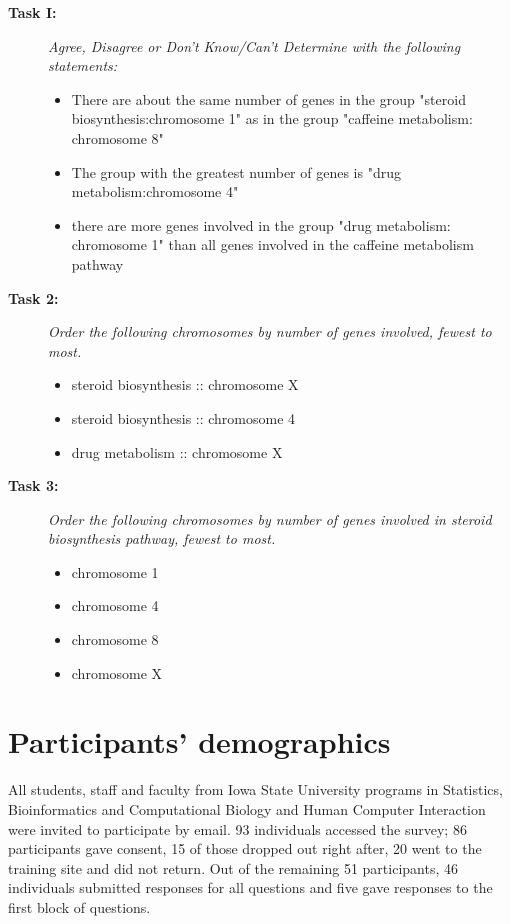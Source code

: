 \begin{description}
\item[\bf Task I:]\emph{ Agree, Disagree or Don't Know/Can't Determine with the following statements:}
\begin{itemize}
\item There are about the same number of genes in the group "steroid biosynthesis:chromosome 1" as in the group "caffeine metabolism: chromosome 8"
\item The group with the greatest number of genes is "drug metabolism:chromosome 4"
\item there are more genes involved in the group "drug metabolism: chromosome 1" than all genes involved in the caffeine metabolism pathway
\end{itemize}

\item[\bf Task 2: \ ]\emph{ Order the following chromosomes by number of genes involved, fewest to most.}
\begin{itemize}
\item steroid biosynthesis :: chromosome X
\item steroid biosynthesis :: chromosome 4
\item drug metabolism :: chromosome X
\end{itemize} 

\item[\bf Task 3: \ ] \emph{ Order the following chromosomes by number of genes involved in steroid biosynthesis pathway, fewest to most.}
\begin{itemize}
\item chromosome 1
\item chromosome 4
\item chromosome 8 
\item chromosome X
\end{itemize}

\end{description} 


%
\section{Participants' demographics}
All students, staff and faculty from Iowa State University programs in Statistics, Bioinformatics and Computational Biology and Human Computer Interaction were invited to participate by email. 93 individuals accessed the survey;
86 participants gave consent, 15  of those dropped out right after, 20 went to the training site and did not return.
Out of the remaining 51 participants, 46  individuals submitted responses for all questions and five gave responses to the first block of questions.

